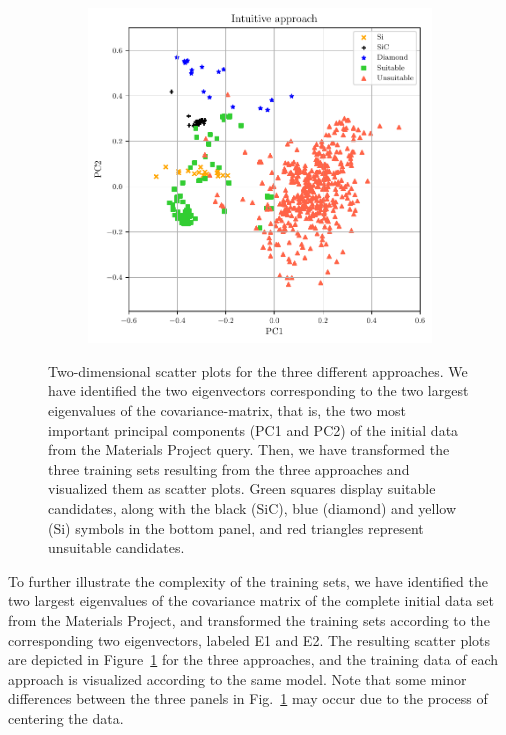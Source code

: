 \documentclass[superscriptaddress,unsortedaddress,
 amsmath,amssymb,
 aps,
]{revtex4-2}
\begin{document}
\begin{figure}
\begin{subfigure}{0.3\textwidth}
    \end{subfigure}
    \begin{subfigure}{0.4\textwidth}
        \centering
        \includegraphics[width=1\textwidth]{figures/pca-2d-plots/03-insightful-approach-v3.pdf}
    \end{subfigure}
    \caption{Two-dimensional scatter plots for the three different approaches. We have identified the two eigenvectors corresponding to the two largest eigenvalues of the covariance-matrix, that is, the two most important principal components (PC1 and PC2) of the initial data from the Materials Project query. Then, we have transformed the three training sets resulting from the three approaches and visualized them as scatter plots. Green squares display suitable candidates, along with the black (SiC), blue (diamond) and yellow (Si) symbols in the bottom panel, and red triangles represent unsuitable candidates.}
    \label{fig:2dscatterplotpca}
\end{figure}


To further illustrate the complexity of the training sets, we have identified the two largest eigenvalues of the covariance matrix \cite{Hastie2009} of the complete initial data set from the Materials Project, and transformed the training sets according to the corresponding two eigenvectors, labeled E1 and E2. 
The resulting scatter plots are depicted in Figure~\ref{fig:2dscatterplotpca} for the three approaches, and the training data of each approach is visualized according to the same model. Note that some minor differences between the three panels in Fig.~\ref{fig:2dscatterplotpca} may occur due to the process of centering the data. 
\end{document}
